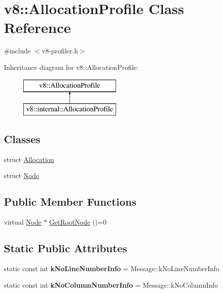 \hypertarget{classv8_1_1_allocation_profile}{}\section{v8\+:\+:Allocation\+Profile Class Reference}
\label{classv8_1_1_allocation_profile}


{\ttfamily \#include $<$v8-\/profiler.\+h$>$}

Inheritance diagram for v8\+:\+:Allocation\+Profile\+:\begin{figure}[H]
\begin{center}
\leavevmode
\includegraphics[height=2.000000cm]{classv8_1_1_allocation_profile}
\end{center}
\end{figure}
\subsection*{Classes}
\begin{DoxyCompactItemize}
\item 
struct \hyperlink{structv8_1_1_allocation_profile_1_1_allocation}{Allocation}
\item 
struct \hyperlink{structv8_1_1_allocation_profile_1_1_node}{Node}
\end{DoxyCompactItemize}
\subsection*{Public Member Functions}
\begin{DoxyCompactItemize}
\item 
virtual \hyperlink{structv8_1_1_allocation_profile_1_1_node}{Node} $\ast$ \hyperlink{classv8_1_1_allocation_profile_afea045dae30df5477088e2f0b7edb6c4}{Get\+Root\+Node} ()=0
\end{DoxyCompactItemize}
\subsection*{Static Public Attributes}
\begin{DoxyCompactItemize}
\item 
static const int {\bfseries k\+No\+Line\+Number\+Info} = Message\+::k\+No\+Line\+Number\+Info\hypertarget{classv8_1_1_allocation_profile_a26fdfe9e4846d26c83d0ad8c2ed2d783}{}\label{classv8_1_1_allocation_profile_a26fdfe9e4846d26c83d0ad8c2ed2d783}

\item 
static const int {\bfseries k\+No\+Column\+Number\+Info} = Message\+::k\+No\+Column\+Info\hypertarget{classv8_1_1_allocation_profile_a9cfa103f73e82629694eee3734826eb7}{}\label{classv8_1_1_allocation_profile_a9cfa103f73e82629694eee3734826eb7}

\end{DoxyCompactItemize}


